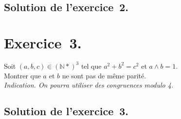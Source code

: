 \documentclass[a4paper,14pt]{extarticle} %
\def\eclaire{\mathbb}
\def\N{\ensuremath{\eclaire N}}
\begin{document}
\subsection*{Solution de l'exercice~2.}



\section*{Exercice~3.}

Soit $(a,b,c) \in (\N*)^3$ tel que $a^2+b^2=c^2$ et $ a \wedge b =1$.\\ Montrer que $a$ et $ b$ ne sont pas de même parité.\\
\textsl{Indication. On pourra utiliser des congruences modulo 4.}


\subsection*{Solution de l'exercice~3.}
\end{document}
